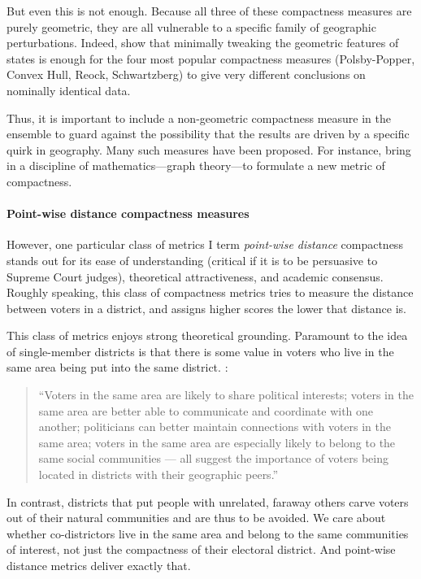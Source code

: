 \documentclass[]{article}
\let\oldparagraph\paragraph
\renewcommand{\paragraph}[1]{\oldparagraph{#1}\mbox{}}
\begin{document}
But even this is not enough. Because all three of these compactness
measures are purely geometric, they are all vulnerable to a specific
family of geographic perturbations. Indeed, \cite{bswp} show that
minimally tweaking the geometric features of states is enough for the
four most popular compactness measures (Polsby-Popper, Convex Hull,
Reock, Schwartzberg) to give very different conclusions on nominally
identical data.

Thus, it is important to include a non-geometric compactness measure in
the ensemble to guard against the possibility that the results are
driven by a specific quirk in geography. Many such measures have been
proposed. For instance, \cite{dc2016} bring in a discipline of
mathematics---graph theory---to formulate a new metric of compactness.

\hypertarget{point-wise-distance-compactness-measures}{%
\paragraph{Point-wise distance compactness
measures}\label{point-wise-distance-compactness-measures}}

However, one particular class of metrics I term \emph{point-wise
distance} compactness stands out for its ease of understanding (critical
if it is to be persuasive to Supreme Court judges), theoretical
attractiveness, and academic consensus. Roughly speaking, this class of
compactness metrics tries to measure the distance between voters in a
district, and assigns higher scores the lower that distance is.

This class of metrics enjoys strong theoretical grounding. Paramount to
the idea of single-member districts is that there is some value in
voters who live in the same area being put into the same district.
\cite{er2019}:

\begin{quote}
``Voters in the same area are likely to share political interests;
voters in the same area are better able to communicate and coordinate
with one another; politicians can better maintain connections with
voters in the same area; voters in the same area are especially likely
to belong to the same social communities --- all suggest the importance
of voters being located in districts with their geographic peers.''
\end{quote}

In contrast, districts that put people with unrelated, faraway others
carve voters out of their natural communities and are thus to be
avoided. We care about whether co-districtors live in the same area and
belong to the same communities of interest, not just the compactness of
their electoral district. And point-wise distance metrics deliver
exactly that.
\end{document}
